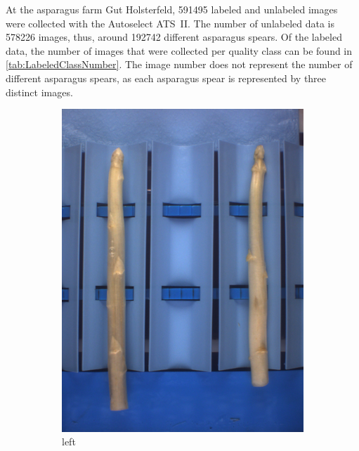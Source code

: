 At the asparagus farm Gut Holsterfeld, 591495 labeled and unlabeled images were collected with the Autoselect ATS~II. The number of unlabeled data is 578226 images, thus, around 192742 different asparagus spears. Of the labeled data, the number of images that were collected per quality class can be found in \autoref{tab:LabeledClassNumber}. The image number does not represent the number of different asparagus spears, as each asparagus spear is represented by three distinct images.

\begin{figure}[!ht]
	\centering
	\vspace{20pt}
	\begin{subfigure}{0.3\textwidth}
		\includegraphics[width=0.9\linewidth]{Figures/chapter02/querdel_a.png}
		\caption{left}
	\end{subfigure}
	\begin{subfigure}{0.3\textwidth}

\end{subfigure}
\end{figure}
